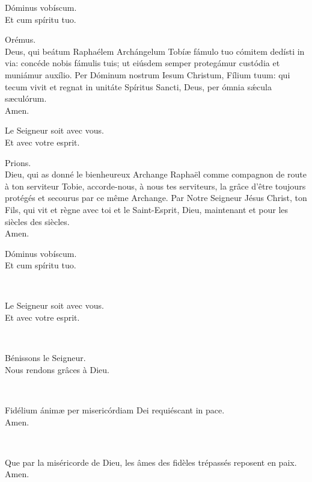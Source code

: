 \documentclass[twoside]{article}
\begin{document}
\begin{paracol}[1]{2}
\switchcolumn*

\vv Dóminus vobíscum. \\
\rr Et cum spíritu tuo.

Orémus.\\
Deus, qui beátum Raphaélem Archángelum Tobíæ fámulo tuo cómitem dedísti in via: concéde nobis fámulis tuis; ut eiúsdem semper protegámur custódia et muniámur auxílio.
Per Dóminum nostrum Iesum Christum, Fílium tuum: qui tecum vivit et regnat in unitáte Spíritus Sancti, Deus, per ómnia sǽcula sæculórum. \\
\rr Amen.

\switchcolumn

\vv Le Seigneur soit avec vous. \\
\rr Et avec votre esprit.

Prions. \\
Dieu, qui as donné le bienheureux Archange Raphaël comme compagnon de route à ton serviteur Tobie, accorde-nous, à nous tes serviteurs, la grâce d’être toujours protégés et secourus par ce même Archange.
Par Notre Seigneur Jésus Christ, ton Fils, qui vit et règne avec toi et le Saint-Esprit, Dieu, maintenant et pour les siècles des siècles.\\
\rr Amen.

\switchcolumn*

\vv Dóminus vobíscum. \\
\rr Et cum spíritu tuo.

~~


\switchcolumn

\vv Le Seigneur soit avec vous. \\
\rr Et avec votre esprit.

~~

\vv Bénissons le Seigneur. \\
\rr Nous rendons grâces à Dieu.

\switchcolumn*

~~

\vv Fidélium ánimæ per misericórdiam Dei requiéscant in pace. \\
\rr Amen.

\switchcolumn

~~

\vv Que par la miséricorde de Dieu, les âmes des fidèles trépassés reposent en paix. \\
\rr Amen.

\end{paracol}
\end{document}
